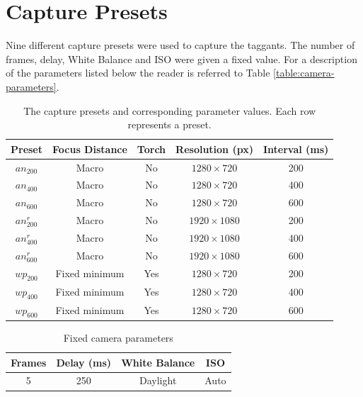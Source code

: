 \documentclass[thesis.tex]{subfiles}
\begin{document}
\chapter{Capture Presets}
\label{appendix:capture-presets}

Nine different capture presets were used to capture the taggants. The number of frames, delay, White Balance and ISO were given a fixed value. For a description of the parameters listed below the reader is referred to Table \ref{table:camera-parameters}.

\begin{table}[ht]
  \caption{The capture presets and corresponding parameter values. Each row represents a preset.}

  \begin{center}
  \begin{tabular}{| c | c | c | c | c |}
    \hline
    \textbf{Preset} & \textbf{Focus Distance} & \textbf{Torch} & \textbf{Resolution (px)} & \textbf{Interval (ms)} \\ \hline
    $an_{200}$ & Macro & No & $1280\times720$ & 200 \\
    \hline
    $an_{400}$ & Macro & No & $1280\times720$ & 400 \\
    \hline
    $an_{600}$ & Macro & No & $1280\times720$ & 600 \\
    \hline
    $an_{200}^r$ & Macro & No & $1920\times1080$ & 200 \\
    \hline
    $an_{400}^r$ & Macro & No & $1920\times1080$ & 400 \\
    \hline
    $an_{600}^r$ & Macro & No & $1920\times1080$ & 600 \\
    \hline
    $wp_{200}$ & Fixed minimum & Yes & $1280\times720$ & 200 \\
    \hline
    $wp_{400}$ & Fixed minimum & Yes & $1280\times720$ & 400 \\
    \hline
    $wp_{600}$ & Fixed minimum & Yes & $1280\times720$ & 600 \\
    \hline
  \end{tabular}
  \end{center}
\end{table}

\begin{table}[ht]
  \caption{Fixed camera parameters}

  \begin{center}
  \begin{tabular}{| c | c | c | c |}
    \hline
    \textbf{Frames}  & \textbf{Delay (ms)} & \textbf{White Balance} & \textbf{ISO} \\ \hline
    5 & 250 & Daylight & Auto \\
    \hline
  \end{tabular}
  \end{center}
\end{table}
\end{document}
